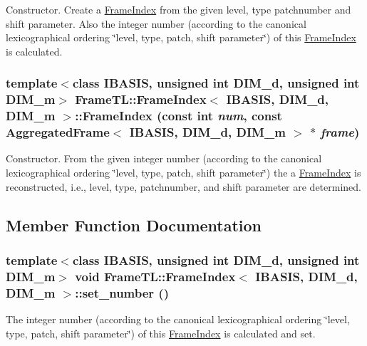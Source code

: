 Constructor. Create a \hyperlink{classFrameTL_1_1FrameIndex}{FrameIndex} from the given level, type patchnumber and shift parameter. Also the integer number (according to the canonical lexicographical ordering \char`\"{}level, type, patch, shift parameter\char`\"{}) of this \hyperlink{classFrameTL_1_1FrameIndex}{FrameIndex} is calculated. \hypertarget{classFrameTL_1_1FrameIndex_a56610938bd08f42df14e503770a89d7}{
\subsubsection[FrameIndex]{\setlength{\rightskip}{0pt plus 5cm}template$<$class IBASIS, unsigned int DIM\_\-d, unsigned int DIM\_\-m$>$ {\bf FrameTL::FrameIndex}$<$ IBASIS, DIM\_\-d, DIM\_\-m $>$::{\bf FrameIndex} (const int {\em num}, \/  const {\bf AggregatedFrame}$<$ IBASIS, DIM\_\-d, DIM\_\-m $>$ $\ast$ {\em frame})}}
\label{classFrameTL_1_1FrameIndex_a56610938bd08f42df14e503770a89d7}


Constructor. From the given integer number (according to the canonical lexicographical ordering \char`\"{}level, type, patch, shift parameter\char`\"{}) the a \hyperlink{classFrameTL_1_1FrameIndex}{FrameIndex} is reconstructed, i.e., level, type, patchnumber, and shift parameter are determined. 

\subsection{Member Function Documentation}
\hypertarget{classFrameTL_1_1FrameIndex_e616e586eab66c5b4109f73dd5e11017}{
\subsubsection[set\_\-number]{\setlength{\rightskip}{0pt plus 5cm}template$<$class IBASIS, unsigned int DIM\_\-d, unsigned int DIM\_\-m$>$ void {\bf FrameTL::FrameIndex}$<$ IBASIS, DIM\_\-d, DIM\_\-m $>$::set\_\-number ()}}
\label{classFrameTL_1_1FrameIndex_e616e586eab66c5b4109f73dd5e11017}


The integer number (according to the canonical lexicographical ordering \char`\"{}level, type, patch, shift parameter\char`\"{}) of this \hyperlink{classFrameTL_1_1FrameIndex}{FrameIndex} is calculated and set. 

